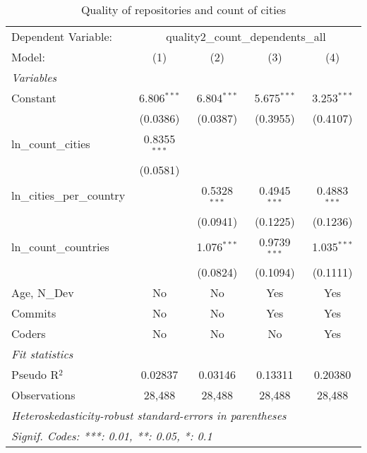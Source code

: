 \begin{table}[htbp]
   \caption{Quality of repositories and count of cities}
   \centering
   \begin{tabular}{lcccc}
      \tabularnewline \midrule \midrule
      Dependent Variable: & \multicolumn{4}{c}{quality2\_count\_dependents\_all}\\
      Model:                      & (1)            & (2)            & (3)            & (4)\\  
      \midrule
      \emph{Variables}\\
      Constant                    & 6.806$^{***}$  & 6.804$^{***}$  & 5.675$^{***}$  & 3.253$^{***}$\\   
                                  & (0.0386)       & (0.0387)       & (0.3955)       & (0.4107)\\   
      ln\_count\_cities           & 0.8355$^{***}$ &                &                &   \\   
                                  & (0.0581)       &                &                &   \\   
      ln\_cities\_per\_country    &                & 0.5328$^{***}$ & 0.4945$^{***}$ & 0.4883$^{***}$\\   
                                  &                & (0.0941)       & (0.1225)       & (0.1236)\\   
      ln\_count\_countries        &                & 1.076$^{***}$  & 0.9739$^{***}$ & 1.035$^{***}$\\   
                                  &                & (0.0824)       & (0.1094)       & (0.1111)\\   
      Age, N\_Dev                 & No             & No             & Yes            & Yes\\  
      Commits                     & No             & No             & Yes            & Yes\\  
      Coders                      & No             & No             & No             & Yes\\  
      \midrule
      \emph{Fit statistics}\\
      Pseudo R$^2$                & 0.02837        & 0.03146        & 0.13311        & 0.20380\\  
      Observations                & 28,488         & 28,488         & 28,488         & 28,488\\  
      \midrule \midrule
      \multicolumn{5}{l}{\emph{Heteroskedasticity-robust standard-errors in parentheses}}\\
      \multicolumn{5}{l}{\emph{Signif. Codes: ***: 0.01, **: 0.05, *: 0.1}}\\
   \end{tabular}
\end{table}



